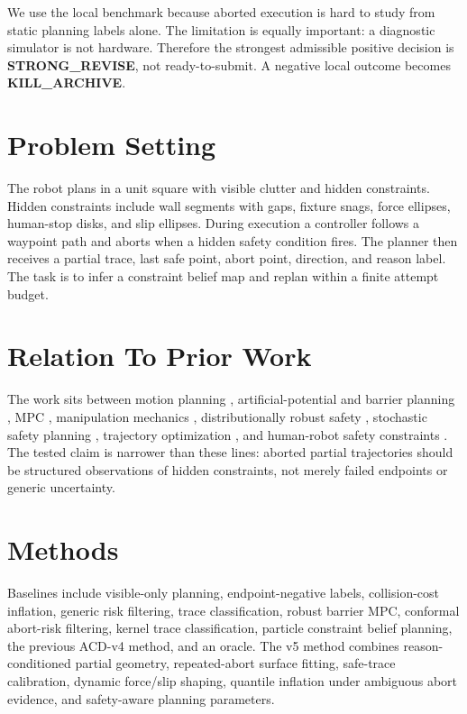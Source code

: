 \documentclass{article}
\begin{document}
We use the local benchmark because aborted execution is hard to study from static planning labels alone.  The limitation is equally important: a diagnostic simulator is not hardware.  Therefore the strongest admissible positive decision is \textbf{STRONG\_REVISE}, not ready-to-submit.  A negative local outcome becomes \textbf{KILL\_ARCHIVE}.

\section{Problem Setting}
The robot plans in a unit square with visible clutter and hidden constraints.  Hidden constraints include wall segments with gaps, fixture snags, force ellipses, human-stop disks, and slip ellipses.  During execution a controller follows a waypoint path and aborts when a hidden safety condition fires.  The planner then receives a partial trace, last safe point, abort point, direction, and reason label.  The task is to infer a constraint belief map and replan within a finite attempt budget.

\section{Relation To Prior Work}
The work sits between motion planning \citep{lavalle2006planning}, artificial-potential and barrier planning \citep{khatib1986potential,ames2017cbf}, MPC \citep{rawlings2017mpc}, manipulation mechanics \citep{mason2001mechanics}, distributionally robust safety \citep{icra2020cvar}, stochastic safety planning \citep{icra2013stochastic}, trajectory optimization \citep{schulman2013chomp}, and human-robot safety constraints \citep{kim2018cartesian}.  The tested claim is narrower than these lines: aborted partial trajectories should be structured observations of hidden constraints, not merely failed endpoints or generic uncertainty.

\section{Methods}
Baselines include visible-only planning, endpoint-negative labels, collision-cost inflation, generic risk filtering, trace classification, robust barrier MPC, conformal abort-risk filtering, kernel trace classification, particle constraint belief planning, the previous ACD-v4 method, and an oracle.  The v5 method combines reason-conditioned partial geometry, repeated-abort surface fitting, safe-trace calibration, dynamic force/slip shaping, quantile inflation under ambiguous abort evidence, and safety-aware planning parameters.
\end{document}
